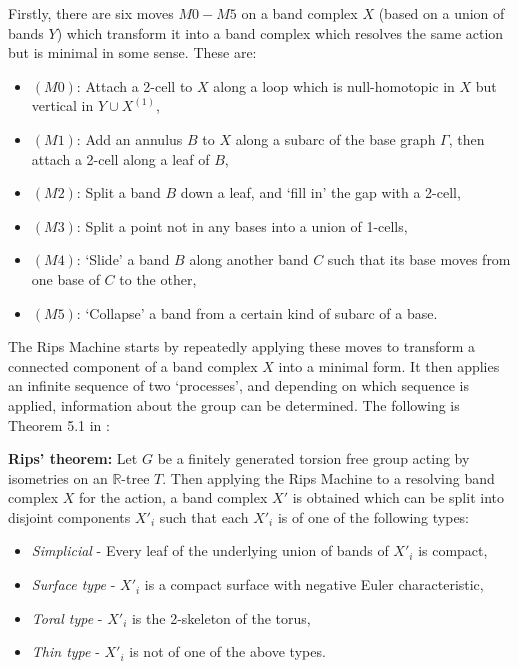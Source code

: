 Firstly, there are six moves $M0-M5$ on a band complex $X$ (based on a union of bands $Y$) which transform it into a band complex which resolves the same action but is minimal in some sense. These are:
\begin{itemize}
    \item $(M0)$: Attach a 2-cell to $X$ along a loop which is null-homotopic in $X$ but vertical in $Y\cup X^{(1)}$,
    \item $(M1)$: Add an annulus $B$ to $X$ along a subarc of the base graph $\Gamma$, then attach a 2-cell along a leaf of $B$,
    \item $(M2)$: Split a band $B$ down a leaf, and `fill in' the gap with a 2-cell,
    \item $(M3)$: Split a point not in any bases into a union of 1-cells,
    \item $(M4)$: `Slide' a band $B$ along another band $C$ such that its base moves from one base of $C$ to the other,
    \item $(M5)$: `Collapse' a band from a certain kind of subarc of a base.
\end{itemize}

The Rips Machine starts by repeatedly applying these moves to transform a connected component of a band complex $X$ into a minimal form. It then applies an infinite sequence of two `processes', and depending on which sequence is applied, information about the group can be determined. The following is Theorem 5.1 in \cite{Bestvina_trees}:

\begin{theorem}\label{rips}
    \textbf{Rips' theorem:} Let $G$ be a finitely generated torsion free group acting by isometries on an $\mathbb{R}$-tree $T$. Then applying the Rips Machine to a resolving band complex $X$ for the action, a band complex $X'$ is obtained which can be split into disjoint components $X'_i$ such that each $X'_i$ is of one of the following types:
    \begin{itemize}
        \item \emph{Simplicial} - Every leaf of the underlying union of bands of $X'_i$ is compact,
        \item \emph{Surface type} - $X'_i$ is a compact surface with negative Euler characteristic,
        \item \emph{Toral type} - $X'_i$ is the 2-skeleton of the torus,
        \item \emph{Thin type} - $X'_i$ is not of one of the above types.
    \end{itemize}
\end{theorem}

